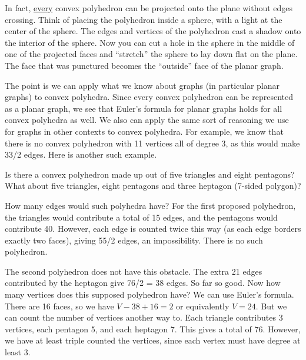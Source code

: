 \documentclass[12pt]{article}
\begin{document}
\begin{center}
\end{center}

In fact, \underline{every} convex polyhedron can be projected onto the plane without edges crossing.  Think of placing the polyhedron inside a sphere, with a light at the center of the sphere.  The edges and vertices of the polyhedron cast a shadow onto the interior of the sphere.  Now you can cut a hole in the sphere in the middle of one of the projected faces and ``stretch'' the sphere to lay down flat on the plane.  The face that was punctured becomes the ``outside'' face of the planar graph.

The point is we can apply what we know about graphs (in particular planar graphs) to convex polyhedra.  Since every convex polyhedron can be represented as a planar graph, we see that Euler's formula for planar graphs holds for all convex polyhedra as well.  We also can apply the same sort of reasoning we use for graphs in other contexts to convex polyhedra.  For example, we know that there is no convex polyhedron with 11 vertices all of degree 3, as this would make 33/2 edges.  Here is another such example.

\begin{example}
Is there a convex polyhedron made up out of five triangles and eight pentagons?  What about five triangles, eight pentagons and three heptagon (7-sided polygon)?

\begin{solution}
How many edges would such polyhedra have?  For the first proposed polyhedron, the triangles would contribute a total of 15 edges, and the pentagons would contribute 40.  However, each edge is counted twice this way (as each edge borders exactly two faces), giving 55/2 edges, an impossibility.  There is no such polyhedron.

The second polyhedron does not have this obstacle. The extra 21 edges contributed by the heptagon give 76/2 = 38 edges.  So far so good.  Now how many vertices does this supposed polyhedron have?  We can use Euler's formula.  There are 16 faces, so we have $V - 38 + 16 = 2$ or equivalently $V = 24$.  But we can count the number of vertices another way to.  Each triangle contributes 3 vertices, each pentagon 5, and each heptagon 7.  This gives a total of 76.  However, we have at least triple counted the vertices, since each vertex must have degree at least 3.  
\end{solution}


\end{example}

\end{document}
